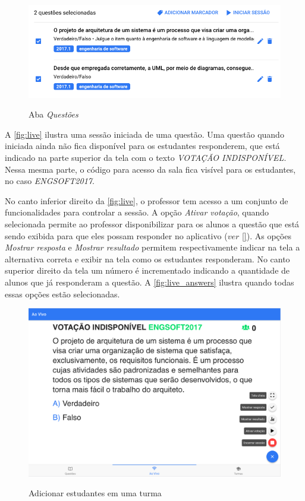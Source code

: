 \begin{figure}[h]
  \centering
  \caption{Aba \textit{Questões}}
  \includegraphics[scale=.50]{imagens/telas/session_details}
  \doautor
  \label{fig:session_details}
\end{figure}

A \autoref{fig:live} ilustra uma sessão iniciada de uma questão. Uma questão quando
iniciada ainda não fica disponível para os estudantes responderem, que está indicado
na parte superior da tela com o texto \textit{VOTAÇÃO INDISPONÍVEL}. Nessa mesma parte,
o código para acesso da sala fica visível para os estudantes, no caso \textit{ENGSOFT2017}.

No canto inferior direito da \autoref{fig:live}, o professor tem acesso a um conjunto de
funcionalidades para controlar a sessão. A opção \textit{Ativar votação}, quando selecionada
permite ao professor disponibilizar para os alunos a questão que está sendo exibida para que
eles possam responder no aplicativo ($ver$ \autoref{}). As opções \textit{Mostrar resposta}
e \textit{Mostrar resultado} permitem respectivamente indicar na tela a alternativa correta e
exibir na tela como os estudantes responderam. No canto superior direito da tela um número é incrementado indicando
a quantidade de alunos que já responderam a questão. A \autoref{fig:live_answers} ilustra quando
todas essas opções estão selecionadas.

\begin{figure}[h]
  \centering
  \caption{Adicionar estudantes em uma turma}
  \includegraphics[scale=.4]{imagens/telas/live}
  \doautor
  \label{fig:live}
\end{figure}

